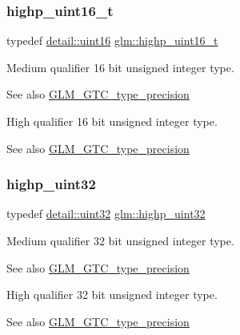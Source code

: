 \subsubsection{\texorpdfstring{highp\+\_\+uint16\+\_\+t}{highp\_uint16\_t}}
{\footnotesize\ttfamily typedef \hyperlink{namespaceglm_1_1detail_a47b2a7d006d187338e8031a352d1ce56}{detail\+::uint16} \hyperlink{group__gtc__type__precision_ga3145bc0ee80432c165e985a188a722b3}{glm\+::highp\+\_\+uint16\+\_\+t}}

Medium qualifier 16 bit unsigned integer type. \begin{DoxySeeAlso}{See also}
\hyperlink{group__gtc__type__precision}{G\+L\+M\+\_\+\+G\+T\+C\+\_\+type\+\_\+precision}
\end{DoxySeeAlso}
High qualifier 16 bit unsigned integer type. \begin{DoxySeeAlso}{See also}
\hyperlink{group__gtc__type__precision}{G\+L\+M\+\_\+\+G\+T\+C\+\_\+type\+\_\+precision} 
\end{DoxySeeAlso}
\mbox{\label{group__gtc__type__precision_ga3145e44c73e2df7dfe4f3cb65974bf22}} 
\subsubsection{\texorpdfstring{highp\+\_\+uint32}{highp\_uint32}}
{\footnotesize\ttfamily typedef \hyperlink{namespaceglm_1_1detail_ade6cfbf377022aaa391af8cd50489222}{detail\+::uint32} \hyperlink{group__gtc__type__precision_ga3145e44c73e2df7dfe4f3cb65974bf22}{glm\+::highp\+\_\+uint32}}

Medium qualifier 32 bit unsigned integer type. \begin{DoxySeeAlso}{See also}
\hyperlink{group__gtc__type__precision}{G\+L\+M\+\_\+\+G\+T\+C\+\_\+type\+\_\+precision}
\end{DoxySeeAlso}
High qualifier 32 bit unsigned integer type. \begin{DoxySeeAlso}{See also}
\hyperlink{group__gtc__type__precision}{G\+L\+M\+\_\+\+G\+T\+C\+\_\+type\+\_\+precision} 
\end{DoxySeeAlso}
\mbox{\label{group__gtc__type__precision_ga8eb85ad460079c63b68866ae34637bda}} 
